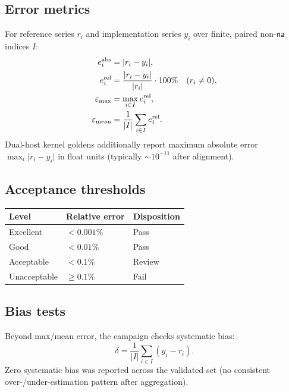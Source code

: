 \documentclass[11pt,a4paper]{article}
\begin{document}
\subsection{Error metrics}
For reference series $r_i$ and implementation series $y_i$ over finite,
paired non-$\textsf{na}$ indices $I$:
\begin{align}
  e^{\mathrm{abs}}_i &= \lvert r_i - y_i\rvert,
  \label{eq:abs}\\
  e^{\mathrm{rel}}_i &= \frac{\lvert r_i - y_i\rvert}{\lvert r_i\rvert}\cdot 100\%
    \quad (r_i\neq 0),
  \label{eq:rel}\\
  \varepsilon_{\mathrm{max}} &= \max_{i\in I} e^{\mathrm{rel}}_i,
  \label{eq:max}\\
  \varepsilon_{\mathrm{mean}} &= \frac{1}{\lvert I\rvert}\sum_{i\in I} e^{\mathrm{rel}}_i.
  \label{eq:mean}
\end{align}
Dual-host kernel goldens additionally report maximum absolute error
$\max_i\lvert r_i-y_i\rvert$ in float units (typically $\sim 10^{-11}$ after
alignment).

\subsection{Acceptance thresholds}
\begin{center}
\begin{tabular}{lll}
\toprule
Level & Relative error & Disposition \\
\midrule
Excellent & $<0.001\%$ & Pass \\
Good & $<0.01\%$ & Pass \\
Acceptable & $<0.1\%$ & Review \\
Unacceptable & $\ge 0.1\%$ & Fail \\
\bottomrule
\end{tabular}
\end{center}

\subsection{Bias tests}
Beyond max/mean error, the campaign checks systematic bias:
\begin{equation}
  \bar{\delta} = \frac{1}{\lvert I\rvert}\sum_{i\in I}(y_i-r_i).
\end{equation}
Zero systematic bias was reported across the validated set (no consistent
over-/under-estimation pattern after aggregation).
\end{document}
